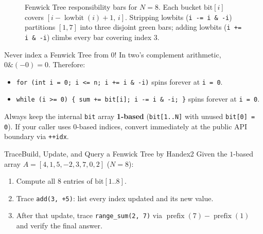 \documentclass[11pt,a4paper]{article}
\theoremstyle{definition}
\begin{document}
\begin{figure}[htbp]
\caption{Fenwick Tree responsibility bars for $N = 8$. Each bucket $\text{bit}[i]$ covers $[i - \operatorname{lowbit}(i) + 1,\, i]$. Stripping lowbits (\texttt{i -= i \& -i}) partitions $[1, 7]$ into three disjoint green bars; adding lowbits (\texttt{i += i \& -i}) climbs every bar covering index $3$.}
\label{fig:fenwick_intervals}
\end{figure}

\begin{watchoutbox}
Never index a Fenwick Tree from $0$! In two's complement arithmetic, $0 \mathbin{\&} (-0) = 0$. Therefore:
\begin{itemize}[itemsep=2pt, topsep=2pt]
    \item \texttt{for (int i = 0; i <= n; i += i \& -i)} spins forever at \texttt{i = 0}.
    \item \texttt{while (i >= 0) \{ sum += bit[i]; i -= i \& -i; \}} spins forever at \texttt{i = 0}.
\end{itemize}
Always keep the internal \texttt{bit} array \textbf{1-based} (\texttt{bit[1..N]} with unused \texttt{bit[0] = 0}). If your caller uses 0-based indices, convert immediately at the public API boundary via \texttt{++idx}.
\end{watchoutbox}

\begin{tryitbox}{Trace}{Build, Update, and Query a Fenwick Tree by Hand}{ex2}
Given the $1$-based array $A = [4, 1, 5, -2, 3, 7, 0, 2]$ ($N = 8$):
\begin{enumerate}[itemsep=2pt, topsep=2pt]
    \item Compute all $8$ entries of $\text{bit}[1..8]$.
    \item Trace \texttt{add(3, +5)}: list every index updated and its new value.
    \item After that update, trace \texttt{range\_sum(2, 7)} via $\operatorname{prefix}(7) - \operatorname{prefix}(1)$ and verify the final answer.
\end{enumerate}
\end{tryitbox}
\end{document}
